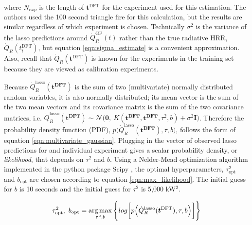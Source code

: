 \documentclass{article}
\begin{document}
\noindent where $N_{exp}$ is the length of $\boldsymbol{t}^{\text{DFT}}$ for the experiment used for this estimation. The authors used the 100 second triangle fire for this calculation, but the results are similar regardless of which experiment is chosen. Technically $\sigma^2$ is the variance of the lasso predictions around $\dot{Q}_{R}^{\text{GP}}(t)$ rather than the true radiative HRR, $\dot{Q}_{R}(t_i^{\text{DFT}})$, but equation \ref{eqn:sigma_estimate} is a convenient approximation. Also, recall that $\dot{Q}_{R}(\boldsymbol{t}^{\text{DFT}})$ is known for the experiments in the training set because they are viewed as calibration experiments.


 Because $\dot{Q}_{R}^{\text{lasso}}(\boldsymbol{t^{\text{DFT}}})$ is the sum of two (multivariate) normally distributed random variables, it is also normally distributed; its mean vector is the sum of the two mean vectors and its covariance matrix is the sum of the two covariance matrices, i.e. $\dot{Q}_{R}^{\text{lasso}}(\boldsymbol{t^{\text{DFT}}}) \sim \mathcal{N}\Big(\boldsymbol{0}, \ K( \boldsymbol{t^{\text{DFT}}}, \boldsymbol{t^{\text{DFT}}}, \tau^2, b) + \sigma^2\boldsymbol{I} \Big)$. Therefore the probability density function (PDF), $p\Big(\dot{Q}_{R}^{\text{lasso}}(\boldsymbol{t^{\text{DFT}}}), \tau, b \Big)$, follows the form of equation \ref{eqn:multivariate_gaussian}. Plugging in the vector of observed lasso predictions for and individual experiment gives a scalar probability density, or \textit{likelihood}, that depends on $\tau^2$ and $b$. Using a Nelder-Mead optimization algorithm \cite{nelder1965simplex} implemented in the python package Scipy \cite{jones2001scipy}, the optimal hyperparameters, $\tau^2_{\text{opt}}$ and $b_{\text{opt}}$ are chosen according to equation \ref{eqn:max_likelihood}. The initial guess for $b$ is 10 seconds and the initial guess for $\tau^2$ is 5,000 kW$^2$. 

\begin{equation}
  \label{eqn:max_likelihood}
  \tau^2_{\text{opt}}, \ b_{\text{opt}} = 
  \operatorname*{arg\,max}_{\tau^2, b} \Bigg\{log\bigg[ p\Big(\dot{Q}_{R}^{\text{lasso}}(\boldsymbol{t^{\text{DFT}}}), \tau, b \Big)\bigg] \Bigg\}
\end{equation}
\end{document}
